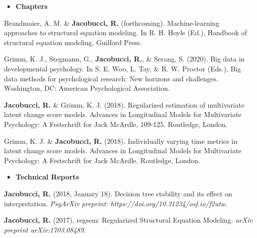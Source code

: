 \documentclass[letterpaper,10pt]{article}
\begin{document}
\vspace{3mm}
%
%
\begin{itemize}
	\item {\textbf{\large{Chapters}}}
\end{itemize}
\begin{etaremune}
	\item Brandmaier, A. M. \& \textbf{Jacobucci, R.} (forthcoming). Machine-learning approaches to structural
	equation modeling. In R. H. Hoyle (Ed.), Handbook of structural equation modeling.
	Guilford Press.
	\item Grimm, K. J., Stegmann, G., \textbf{Jacobucci, R.}, \& Serang, S. (2020). Big data in developmental psychology. In S. E. Woo, L. Tay, \& R. W. Proctor (Eds.), Big data methods for psychological research: New horizons and challenges. Washington, DC: American Psychological Association.
	\item  \textbf{Jacobucci, R.} \& Grimm, K. J. (2018). Regularized estimation of multivariate latent change score models. Advances in Longitudinal Models for Multivariate Psychology: A Festschrift for Jack McArdle, 109-125. Routledge, London.
	\item Grimm, K. J. \& \textbf{Jacobucci, R.} (2018). Individually varying time metrics in latent change score models. Advances in Longitudinal Models for Multivariate Psychology: A Festschrift for Jack McArdle. Routledge, London.
\end{etaremune}
\begin{itemize}
	\vspace{3mm}
	\item {\textbf{\large{Technical Reports}}}
\end{itemize}
\begin{etaremune}
	\item \textbf{Jacobucci, R.}  (2018, January 18). Decision tree stability and its effect on interpretation. \emph{PsyArXiv preprint: https://doi.org/10.31234/osf.io/f2utw}.
	\item \textbf{Jacobucci, R.} (2017). regsem: Regularized Structural Equation Modeling. \emph{arXiv preprint arXiv:1703.08489}.
	\vspace{3mm}
\end{etaremune}
\end{document}
